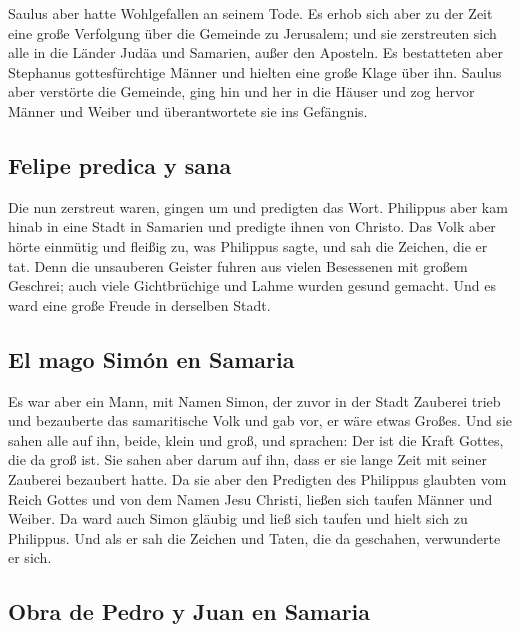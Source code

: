  Saulus aber hatte Wohlgefallen an seinem Tode. Es erhob
sich aber zu der Zeit eine große Verfolgung über die Gemeinde zu
Jerusalem; und sie zerstreuten sich alle in die Länder Judäa und
Samarien, außer den Aposteln.  Es bestatteten aber
Stephanus gottesfürchtige Männer und hielten eine große Klage über ihn.
 Saulus aber verstörte die Gemeinde, ging hin und her in
die Häuser und zog hervor Männer und Weiber und überantwortete sie ins
Gefängnis.

\hypertarget{felipe-predica-y-sana}{%
\subsection{Felipe predica y sana}\label{felipe-predica-y-sana}}

 Die nun zerstreut waren, gingen um und predigten das
Wort.  Philippus aber kam hinab in eine Stadt in Samarien
und predigte ihnen von Christo.  Das Volk aber hörte
einmütig und fleißig zu, was Philippus sagte, und sah die Zeichen, die
er tat.  Denn die unsauberen Geister fuhren aus vielen
Besessenen mit großem Geschrei; auch viele Gichtbrüchige und Lahme
wurden gesund gemacht.  Und es ward eine große Freude in
derselben Stadt.

\hypertarget{el-mago-simuxf3n-en-samaria}{%
\subsection{El mago Simón en
Samaria}\label{el-mago-simuxf3n-en-samaria}}

 Es war aber ein Mann, mit Namen Simon, der zuvor in der
Stadt Zauberei trieb und bezauberte das samaritische Volk und gab vor,
er wäre etwas Großes.  Und sie sahen alle auf ihn, beide,
klein und groß, und sprachen: Der ist die Kraft Gottes, die da groß ist.
 Sie sahen aber darum auf ihn, dass er sie lange Zeit mit
seiner Zauberei bezaubert hatte.  Da sie aber den
Predigten des Philippus glaubten vom Reich Gottes und von dem Namen Jesu
Christi, ließen sich taufen Männer und Weiber.  Da ward
auch Simon gläubig und ließ sich taufen und hielt sich zu Philippus. Und
als er sah die Zeichen und Taten, die da geschahen, verwunderte er sich.

\hypertarget{obra-de-pedro-y-juan-en-samaria}{%
\subsection{Obra de Pedro y Juan en
Samaria}\label{obra-de-pedro-y-juan-en-samaria}}

